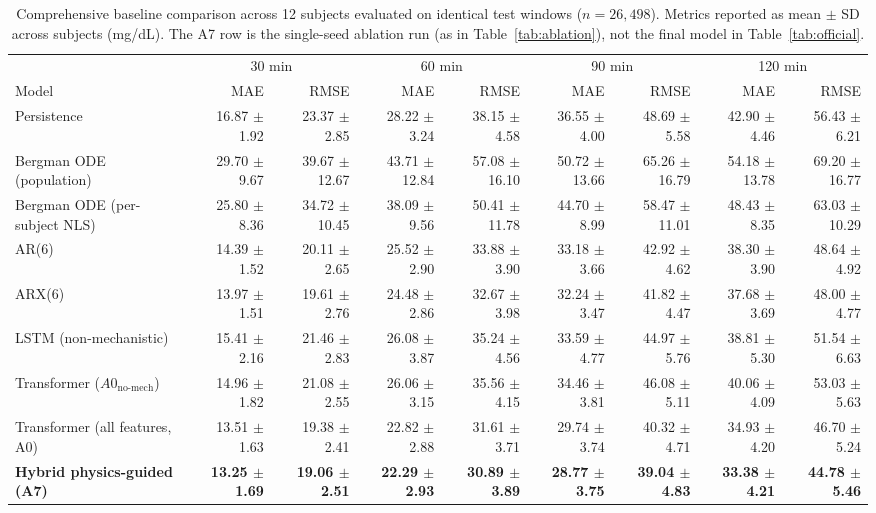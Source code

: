 \documentclass[journal]{IEEEtran}
\begin{document}
\begin{table}[t]
\centering
\caption{Comprehensive baseline comparison across 12 subjects evaluated on identical test windows ($n=26{,}498$). Metrics reported as mean $\pm$ SD across subjects (mg/dL). The A7 row is the single-seed ablation run (as in Table~\ref{tab:ablation}), not the final model in Table~\ref{tab:official}.}
\label{tab:baselines_identical}
\footnotesize
\setlength{\tabcolsep}{4.2pt}
\begin{tabular}{lrrrrrrrr}
\toprule
& \multicolumn{2}{c}{30 min} & \multicolumn{2}{c}{60 min} & \multicolumn{2}{c}{90 min} & \multicolumn{2}{c}{120 min} \\
\cmidrule(lr){2-3} \cmidrule(lr){4-5} \cmidrule(lr){6-7} \cmidrule(lr){8-9}
Model & MAE & RMSE & MAE & RMSE & MAE & RMSE & MAE & RMSE \\
\midrule
Persistence & 16.87 $\pm$ 1.92 & 23.37 $\pm$ 2.85 & 28.22 $\pm$ 3.24 & 38.15 $\pm$ 4.58 & 36.55 $\pm$ 4.00 & 48.69 $\pm$ 5.58 & 42.90 $\pm$ 4.46 & 56.43 $\pm$ 6.21 \\
Bergman ODE (population) & 29.70 $\pm$ 9.67 & 39.67 $\pm$ 12.67 & 43.71 $\pm$ 12.84 & 57.08 $\pm$ 16.10 & 50.72 $\pm$ 13.66 & 65.26 $\pm$ 16.79 & 54.18 $\pm$ 13.78 & 69.20 $\pm$ 16.77 \\
Bergman ODE (per-subject NLS) & 25.80 $\pm$ 8.36 & 34.72 $\pm$ 10.45 & 38.09 $\pm$ 9.56 & 50.41 $\pm$ 11.78 & 44.70 $\pm$ 8.99 & 58.47 $\pm$ 11.01 & 48.43 $\pm$ 8.35 & 63.03 $\pm$ 10.29 \\
AR(6) & 14.39 $\pm$ 1.52 & 20.11 $\pm$ 2.65 & 25.52 $\pm$ 2.90 & 33.88 $\pm$ 3.90 & 33.18 $\pm$ 3.66 & 42.92 $\pm$ 4.62 & 38.30 $\pm$ 3.90 & 48.64 $\pm$ 4.92 \\
ARX(6) & 13.97 $\pm$ 1.51 & 19.61 $\pm$ 2.76 & 24.48 $\pm$ 2.86 & 32.67 $\pm$ 3.98 & 32.24 $\pm$ 3.47 & 41.82 $\pm$ 4.47 & 37.68 $\pm$ 3.69 & 48.00 $\pm$ 4.77 \\
LSTM (non-mechanistic) & 15.41 $\pm$ 2.16 & 21.46 $\pm$ 2.83 & 26.08 $\pm$ 3.87 & 35.24 $\pm$ 4.56 & 33.59 $\pm$ 4.77 & 44.97 $\pm$ 5.76 & 38.81 $\pm$ 5.30 & 51.54 $\pm$ 6.63 \\
Transformer ($A0_{\text{no-mech}}$) & 14.96 $\pm$ 1.82 & 21.08 $\pm$ 2.55 & 26.06 $\pm$ 3.15 & 35.56 $\pm$ 4.15 & 34.46 $\pm$ 3.81 & 46.08 $\pm$ 5.11 & 40.06 $\pm$ 4.09 & 53.03 $\pm$ 5.63 \\
Transformer (all features, A0) & 13.51 $\pm$ 1.63 & 19.38 $\pm$ 2.41 & 22.82 $\pm$ 2.88 & 31.61 $\pm$ 3.71 & 29.74 $\pm$ 3.74 & 40.32 $\pm$ 4.71 & 34.93 $\pm$ 4.20 & 46.70 $\pm$ 5.24 \\
\textbf{Hybrid physics-guided (A7)} & \textbf{13.25 $\pm$ 1.69} & \textbf{19.06 $\pm$ 2.51} & \textbf{22.29 $\pm$ 2.93} & \textbf{30.89 $\pm$ 3.89} & \textbf{28.77 $\pm$ 3.75} & \textbf{39.04 $\pm$ 4.83} & \textbf{33.38 $\pm$ 4.21} & \textbf{44.78 $\pm$ 5.46} \\
\bottomrule
\end{tabular}
\end{table}
\end{document}
